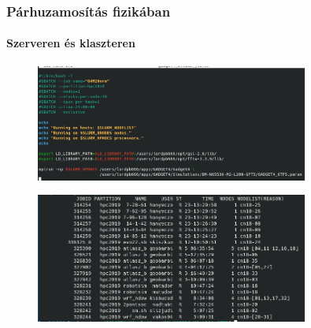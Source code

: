 \begin{frame}
\frametitle{Párhuzamosítás fizikában}
\framesubtitle{Szerveren és klaszteren}

\begin{figure}
	\includegraphics[width=0.8\textwidth]{img/slurm-job.png}
\end{figure}
	
\begin{figure}
	\includegraphics[width=0.8\textwidth]{img/slurm-squeue.png}
\end{figure}

\end{frame}